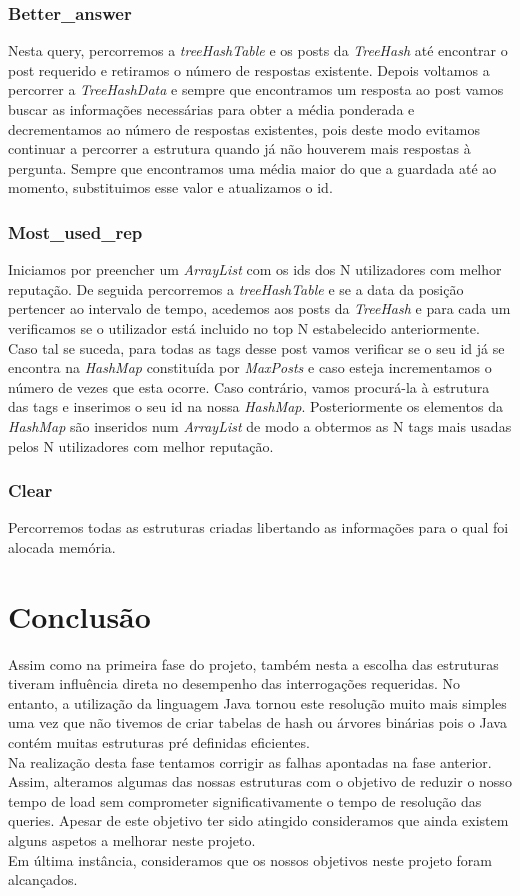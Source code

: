 \documentclass[10pt,a4paper]{article}
\begin{document}
\subsubsection{Better\_answer} 
Nesta query, percorremos a \textit{treeHashTable} e os posts da  \textit{TreeHash} até encontrar o post requerido e retiramos o número de respostas existente. Depois voltamos a percorrer a \textit{TreeHashData} e sempre que encontramos um resposta ao post vamos buscar as informações necessárias para obter a média ponderada e decrementamos ao número de respostas existentes, pois deste modo evitamos continuar a percorrer a estrutura quando já não houverem mais respostas à pergunta. Sempre que encontramos uma média maior do que a guardada até ao momento, substituimos esse valor e atualizamos o id.

\subsubsection{Most\_used\_rep} 
Iniciamos por preencher um \textit{ArrayList} com os ids dos N utilizadores com melhor reputação. De seguida percorremos a \textit{treeHashTable} e se a data da posição pertencer ao intervalo de tempo, acedemos aos posts da \textit{TreeHash} e para cada um verificamos se o utilizador está incluido no top N estabelecido anteriormente. Caso tal se suceda, para todas as tags desse post vamos verificar se o seu id já se encontra na \textit{HashMap} constituída por \textit{MaxPosts} e caso esteja incrementamos o número de vezes que esta ocorre. Caso contrário, vamos procurá-la à estrutura das tags e inserimos o seu id na nossa \textit{HashMap}. Posteriormente os elementos da \textit{HashMap} são inseridos num \textit{ArrayList} de modo a obtermos as N tags mais usadas pelos N utilizadores com melhor reputação.\\

\subsubsection{Clear} 
Percorremos todas as estruturas criadas libertando as informações para o qual foi alocada memória.
\cleardoublepage
\section{Conclusão}
Assim como na primeira fase do projeto, também nesta a escolha das estruturas tiveram influência direta no desempenho das interrogações requeridas. No entanto, a utilização da linguagem Java tornou este resolução muito mais simples uma vez que não tivemos de criar tabelas de hash ou árvores binárias pois o Java contém muitas estruturas pré definidas eficientes.\\
\indent Na realização desta fase tentamos corrigir as falhas apontadas na fase anterior. Assim, alteramos algumas das nossas estruturas com o objetivo de reduzir o nosso tempo de load sem comprometer significativamente o tempo de resolução das queries. Apesar de este objetivo ter sido atingido consideramos que ainda existem alguns aspetos a melhorar neste projeto.\\
\indent Em última instância, consideramos que os nossos objetivos neste projeto foram alcançados.
\end{document}
